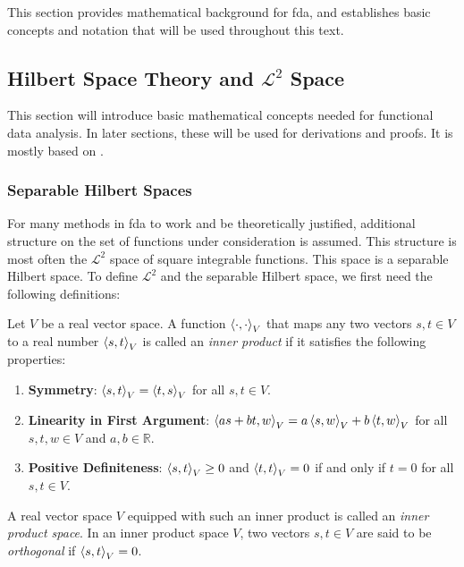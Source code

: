 This section provides mathematical background for fda, and establishes basic concepts
and notation that will be used throughout this text.

\subsection{Hilbert Space Theory and $\mathcal{L}^2$ Space}
\label{sec:hilbert spaces and l2}
This section will introduce basic mathematical concepts needed for functional data
analysis. In later sections, these will be used for derivations and proofs. It is mostly
based on \textcite[Chapter~2]{HsingEubank2015}.

\subsubsection{Separable Hilbert Spaces}
\label{sec:separable hilbert spaces}
For many methods in fda to work and be theoretically justified, additional structure on
the set of functions under consideration is assumed. This structure is most often the
$\mathcal{L}^2$ space of square integrable functions. This space is a separable Hilbert
space. To define $\mathcal{L}^2$ and the separable Hilbert space, we first need the
following definitions:
\begin{definition}
    \label{def:inpr}
    Let \( V \) be a real vector space. A function $\left \langle \cdot, \cdot \right \rangle_V$ that maps any
    two vectors \( s, t \in V \) to a real number \( \left \langle s, t \right \rangle_V \) is called an
    \textit{inner product} if it satisfies the following properties:
    \begin{enumerate}
        \item \textbf{Symmetry}: \( \left \langle s, t \right \rangle_V  = \left \langle t, s \right \rangle_V \) for all \( s, t \in V \).
        \item \textbf{Linearity in First Argument}: \( \left \langle as + bt, w \right \rangle_V = a \left \langle s, w \right \rangle_V + b \left \langle t, w \right \rangle_V \) for all \( s, t, w \in V \) and \( a, b \in \mathbb{R} \).
        \item \textbf{Positive Definiteness}: \( \left \langle s, t \right \rangle_V \geq 0 \) and \( \left \langle t, t \right \rangle_V = 0 \) if and only if \( t = 0 \) for all \( s, t \in V \).
    \end{enumerate}
    A real vector space \( V \) equipped with such an inner product is called an
    \textit{inner product space}. In an inner product space \( V \), two vectors
    \( s, t \in V \) are said to be \textit{orthogonal} if
    $\left \langle s, t \right \rangle_V = 0 $.
\end{definition}
